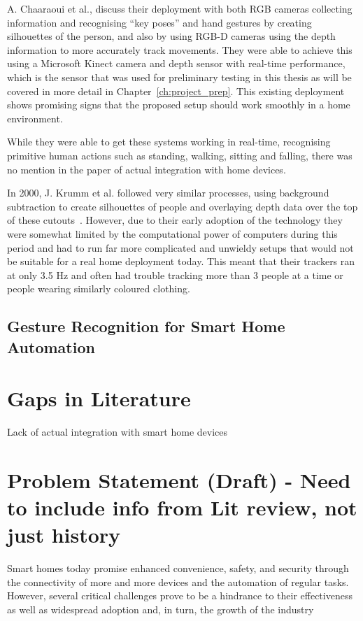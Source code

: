 A. Chaaraoui et al., discuss their deployment with both RGB cameras collecting information and recognising ``key poses'' and hand gestures by creating silhouettes of the person, and also by using RGB-D cameras using the depth information to more accurately track movements.
They were able to achieve this using a Microsoft Kinect camera and depth sensor with real-time performance, which is the sensor that was used for preliminary testing in this thesis as will be covered in more detail in Chapter~\ref{ch:project_prep}.
This existing deployment shows promising signs that the proposed setup should work smoothly in a home environment.

While they were able to get these systems working in real-time, recognising primitive human actions such as standing, walking, sitting and falling, there was no mention in the paper of actual integration with home devices.

In 2000, J. Krumm et al. followed very similar processes, using background subtraction to create silhouettes of people and overlaying depth data over the top of these cutouts~\cite{Krum00}.
However, due to their early adoption of the technology they were somewhat limited by the computational power of computers during this period and had to run far more complicated and unwieldy setups that would not be suitable for a real home deployment today.
This meant that their trackers ran at only 3.5 Hz and often had trouble tracking more than 3 people at a time or people wearing similarly coloured clothing.

\subsection{Gesture Recognition for Smart Home Automation}

\section{Gaps in Literature}
Lack of actual integration with smart home devices

\section{Problem Statement (Draft) - Need to include info from Lit review, not just history}
Smart homes today promise enhanced convenience, safety, and security through the connectivity of more and more devices and the automation of regular tasks.
However, several critical challenges prove to be a hindrance to their effectiveness as well as widespread adoption and, in turn, the growth of the industry

